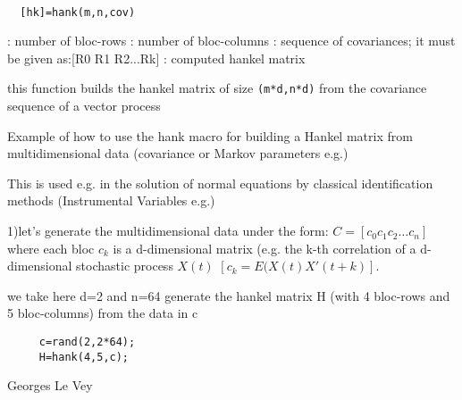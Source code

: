 \begin{mandesc}
   \\ %
\end{mandesc}
\begin{calling_sequence}
\begin{verbatim}
  [hk]=hank(m,n,cov)  
\end{verbatim}
\end{calling_sequence}
\begin{parameters}
  \begin{varlist}
    : number of bloc-rows
    : number of bloc-columns
    : sequence of covariances; it must be given as:[R0 R1 R2...Rk]
    : computed hankel matrix
  \end{varlist}
\end{parameters}
\begin{mandescription}
  this function builds the hankel matrix of size \verb!(m*d,n*d)!
  from the covariance sequence of a vector process
\end{mandescription}
\begin{examples}
   Example of how to use the hank macro for 
   building a Hankel matrix from multidimensional 
   data (covariance or Markov parameters e.g.)
    
   This is used e.g. in the solution of normal equations
   by classical identification methods (Instrumental Variables e.g.)
    
   1)let's generate the multidimensional data under the form:
   $C=[c_0 c_1 c_2 \ldots c_n]$
   where each bloc $c_k$ is a d-dimensional matrix (e.g. the k-th correlation 
   of a d-dimensional stochastic process $X(t)$ 
   $[c_k = E(X(t) X'(t+k)]$.
    
   we take here d=2 and n=64 
   generate the hankel matrix H (with 4 bloc-rows and 5 bloc-columns)
   from the data in c
   \begin{Verbatim}
     c=rand(2,2*64);
     H=hank(4,5,c);
   \end{Verbatim}
\end{examples}
\begin{manseealso}
\end{manseealso}
\begin{authors}
  Georges Le Vey
\end{authors}
